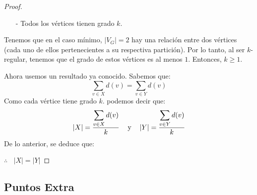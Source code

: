 \documentclass{article}
\begin{document}
\begin{enumerate}
\begin{enumerate}
\begin{proof}
\begin{itemize}
      \item[-] Todos los vértices tienen grado $k$.
      \end{itemize}
      Tenemos que en el caso mínimo, $|V_G| = 2$  hay una relación entre
      dos vértices (cada uno de ellos pertenecientes a su respectiva
      partición). Por lo tanto, al ser $k$-regular, tenemos que el grado
      de estos vértices es al menos $1$. Entonces, $k \geq 1$.
      
      Ahora usemos un resultado ya conocido. Sabemos que:
      \[
      \sum_{v \in X} d(v) = \sum_{v \in Y} d(v)
      \]
      Como cada vértice tiene grado $k$. podemos decir que:
      \[
      \abs{X} = \frac{\displaystyle \sum_{v \in X} d(v)}{k} \text{\hspace{0.3cm}
        y \hspace{0.3cm}} \abs{Y} = \frac{\displaystyle \sum_{v \in Y} d(v)}{k}
      \]
      De lo anterior, se deduce que:

      \hspace*{5.6cm} $\therefore\ \ \ \ |X| = |Y|$
    \end{proof}
  \end{enumerate}
  
\end{enumerate}

\subsection*{Puntos Extra}
\end{document}

